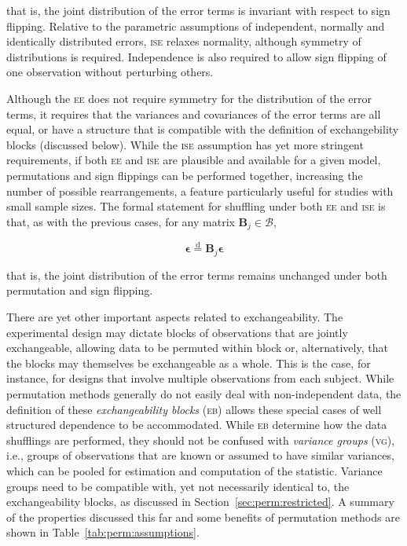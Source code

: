 \noindent
that is, the joint distribution of the error terms is invariant with respect to sign flipping. Relative to the parametric assumptions of independent, normally and identically distributed errors, \textsc{ise} relaxes normality, although symmetry of distributions is required. Independence is also required to allow sign flipping of one observation without perturbing others.

Although the \textsc{ee} does not require symmetry for the distribution of the error terms, it requires that the variances and covariances of the error terms are all equal, or have a structure that is compatible with the definition of exchangebility blocks (discussed below). While the \textsc{ise} assumption has yet more stringent requirements, if both \textsc{ee} and \textsc{ise} are plausible and available for a given model, permutations and sign flippings can be performed together, increasing the number of possible rearrangements, a feature particularly useful for studies with small sample sizes. The formal statement for shuffling under both \textsc{ee} and \textsc{ise} is that, as with the previous cases, for any matrix $\mathbf{B}_{j} \in \mathcal{B}$,

\begin{equation}
\boldsymbol{\epsilon} \stackrel{\mathrm{d}}{=} \mathbf{B}_{j}\boldsymbol{\epsilon}
\end{equation}

\noindent
that is, the joint distribution of the error terms remains unchanged under both permutation and sign flipping.

There are yet other important aspects related to exchangeability. The experimental design may dictate blocks of observations that are jointly exchangeable, allowing data to be permuted within block or, alternatively, that the blocks may themselves be exchangeable as a whole. This is the case, for instance, for designs that involve multiple observations from each subject. While permutation methods generally do not easily deal with non-independent data, the definition of these \emph{exchangeability blocks} (\textsc{eb}) allows these special cases of well structured dependence to be accommodated. While \textsc{eb} determine how the data shufflings are performed, they should not be confused with \emph{variance groups} (\textsc{vg}), i.e., groups of observations that are known or assumed to have similar variances, which can be pooled for estimation and computation of the statistic. Variance groups need to be compatible with, yet not necessarily identical to, the exchangeability blocks, as discussed in Section~\ref{sec:perm:restricted}. A summary of the properties discussed this far and some benefits of permutation methods are shown in Table~\ref{tab:perm:assumptions}.

